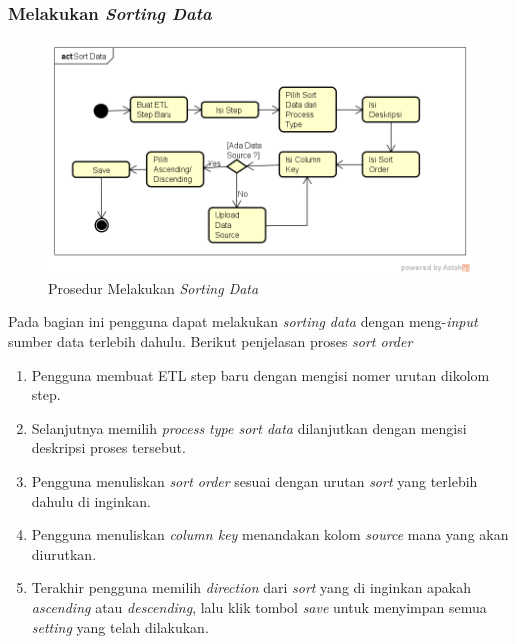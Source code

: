 \subsubsection{Melakukan \textit{Sorting Data}}
	\begin{figure}[H]
	\centering
	\includegraphics[scale=0.5]{Gambar/Sort-Data}
	\caption{Prosedur Melakukan \textit{Sorting Data}}
	\end{figure}
	
	Pada bagian ini pengguna dapat melakukan \textit{sorting data} dengan meng-\textit{input} sumber data terlebih dahulu. 
	Berikut penjelasan proses \textit{sort order}
	\begin{enumerate}
		\item Pengguna membuat ETL step baru dengan mengisi nomer urutan dikolom step.
		\item Selanjutnya memilih \textit{process type sort data} dilanjutkan dengan mengisi deskripsi proses tersebut.
		\item Pengguna menuliskan \textit{sort order} sesuai dengan urutan \textit{sort} yang terlebih dahulu di inginkan.
		\item Pengguna menuliskan \textit{column key} menandakan kolom \textit{source} mana yang akan diurutkan.
		\item Terakhir pengguna memilih \textit{direction} dari \textit{sort} yang di inginkan apakah \textit{ascending} atau \textit{descending}, lalu klik tombol \textit{save} untuk menyimpan semua \textit{setting} yang telah dilakukan.
	\end{enumerate}
	
